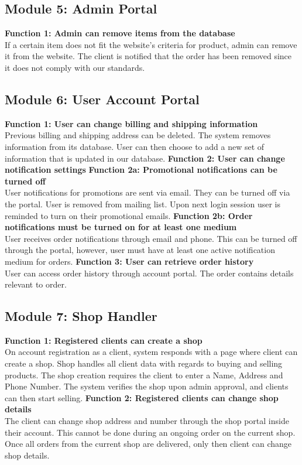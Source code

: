 \subsection*{Module 5: Admin Portal}
\begin{outline}
    \1 \textbf{Function 1: Admin can remove items from the database} \\
    If a certain item does not fit the website's criteria for product, admin can remove it from the website. The client is notified that the order has been removed since it does not comply with our standards.
\end{outline}
\subsection*{Module 6: User Account Portal}
\begin{outline}
    \1 \textbf{Function 1: User can change billing and shipping information} \\
    Previous billing and shipping address can be deleted. The system removes information from its database. User can then choose to add a new set of information that is updated in our database.
    \1 \textbf{Function 2: User can change notification settings}
        \2 \textbf{Function 2a: Promotional notifications can be turned off} \\
        User notifications for promotions are sent via email. They can be turned off via the portal. User is removed from mailing list. Upon next login session user is reminded to turn on their promotional emails.
        \2 \textbf{Function 2b: Order notifications must be turned on for at least one medium} \\
        User receives order notifications through email and phone. This can be turned off through the portal, however, user must have at least one active notification medium for orders.
    \1 \textbf{Function 3: User can retrieve order history} \\
    User can access order history through account portal. The order contains details relevant to order.
\end{outline}

\subsection*{Module 7: Shop Handler}
\begin{outline}
    \1 \textbf{Function 1: Registered clients can create a shop} \\
    On account registration as a client, system responds with a page where client can create a shop. Shop handles all client data with regards to buying and selling products. The shop creation requires the client to enter a Name, Address and Phone Number. The system verifies the shop upon admin approval, and clients can then start selling.
    \1 \textbf{Function 2: Registered clients can change shop details} \\
    The client can change shop address and number through the shop portal inside their account. This cannot be done during an ongoing order on the current shop. Once all orders from the current shop are delivered, only then client can change shop details.
\end{outline}

